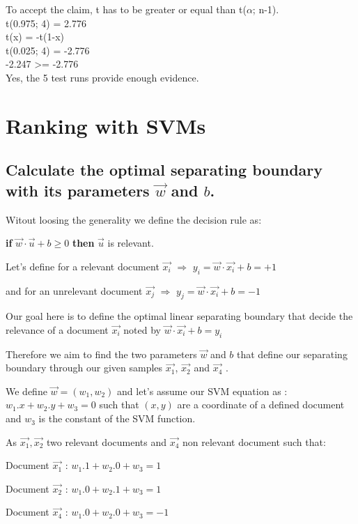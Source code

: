 \documentclass{scrartcl}
\begin{document}
To accept the claim, t has to be greater or equal than t($\alpha$; n-1).\\

t(0.975; 4) = 2.776\\
t(x) = -t(1-x)\\
t(0.025; 4) = -2.776\\

-2.247 >= -2.776\\

Yes, the 5 test runs provide enough evidence.


\section{Ranking with SVMs}

\subsection{Calculate the optimal separating boundary with its parameters $\vec{w}$ and $b$.}

Witout loosing the generality we define the decision rule as:

\textbf{if} $\vec{w}\cdot \vec{u} + b \geq 0$ \textbf{then} $\vec{u}$ is relevant.

Let's define for a relevant document $\vec{x_i}$ $\Rightarrow$  $y_i = \vec{w}\cdot \vec{x_i} + b = +1$

and for an unrelevant document  $\vec{x_j}$ $\Rightarrow$  $y_j = \vec{w}\cdot \vec{x_i} + b = -1$

Our goal here is to define the optimal linear separating boundary that decide the relevance of a document  $\vec{x_i}$ noted by $\vec{w}\cdot \vec{x_i} + b = y_i$ 

Therefore we aim to find the two parameters $\vec{w}$ and $b$ that define our separating boundary through our given samples $\vec{x_1}$, $\vec{x_2}$ and $\vec{x_4}$ .

We define $\vec{w} = (w_1, w_2)$ and let's assume our SVM equation as : $w_1 . x+ w_2 . y + w_3 = 0$ such that $(x,y)$ are a coordinate of a defined document and $w_3$ is the constant of the SVM function.

As $\vec{x_1}, \vec{x_2}$ two relevant documents and $ \vec{x_4}$ non relevant document such that:

Document $\vec{x_1}$ : $w_1 . 1 + w_2 . 0 + w_3 = 1$

Document $\vec{x_2}$ : $w_1 . 0 + w_2 . 1 + w_3 = 1$

Document $\vec{x_4}$ : $w_1 . 0 + w_2 . 0 + w_3 = -1$
\end{document}
